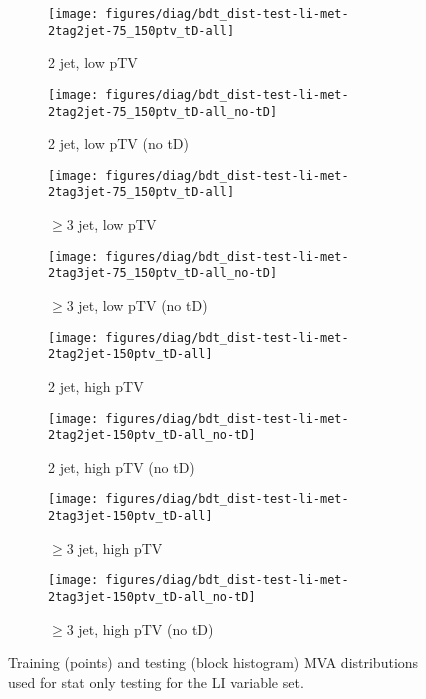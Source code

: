 {\begin{figure}[!htbp]\captionsetup{justification=centering}
  \centering
  \begin{subfigure}[t]{0.49\textwidth}\centering\texttt{[image: figures/diag/bdt\_dist-test-li-met-2tag2jet-75\_150ptv\_tD-all]}\caption{2 jet, low pTV}\end{subfigure}
  \begin{subfigure}[t]{0.49\textwidth}\centering\texttt{[image: figures/diag/bdt\_dist-test-li-met-2tag2jet-75\_150ptv\_tD-all\_no-tD]}\caption{2 jet, low pTV (no tD)}\end{subfigure}
  \begin{subfigure}[t]{0.49\textwidth}\centering\texttt{[image: figures/diag/bdt\_dist-test-li-met-2tag3jet-75\_150ptv\_tD-all]}\caption{$\ge3$ jet, low pTV}\end{subfigure}
  \begin{subfigure}[t]{0.49\textwidth}\centering\texttt{[image: figures/diag/bdt\_dist-test-li-met-2tag3jet-75\_150ptv\_tD-all\_no-tD]}\caption{$\ge3$ jet, low pTV (no tD)}\end{subfigure}
  \begin{subfigure}[t]{0.49\textwidth}\centering\texttt{[image: figures/diag/bdt\_dist-test-li-met-2tag2jet-150ptv\_tD-all]}\caption{2 jet, high pTV}\end{subfigure}
  \begin{subfigure}[t]{0.49\textwidth}\centering\texttt{[image: figures/diag/bdt\_dist-test-li-met-2tag2jet-150ptv\_tD-all\_no-tD]}\caption{2 jet, high pTV (no tD)}\end{subfigure}
  \begin{subfigure}[t]{0.49\textwidth}\centering\texttt{[image: figures/diag/bdt\_dist-test-li-met-2tag3jet-150ptv\_tD-all]}\caption{$\ge3$ jet, high pTV}\end{subfigure}
  \begin{subfigure}[t]{0.49\textwidth}\centering\texttt{[image: figures/diag/bdt\_dist-test-li-met-2tag3jet-150ptv\_tD-all\_no-tD]}\caption{$\ge3$ jet, high pTV (no tD)}\end{subfigure}
  \caption{Training (points) and testing (block histogram) MVA distributions used for stat only testing for the LI variable set.}
  \label{fig:li-met-testing}
\end{figure}

}
